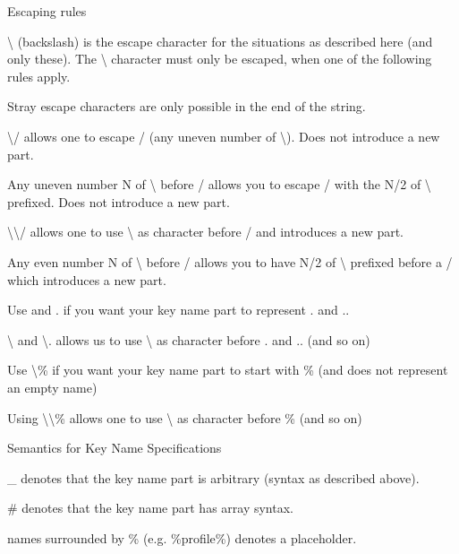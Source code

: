 \begin{DoxyItemize}
\begin{DoxyParagraph}{Escaping rules}
\begin{DoxyItemize}
\item \textbackslash{} (backslash) is the escape character for the situations as described here (and only these). The \textbackslash{} character must only be escaped, when one of the following rules apply.
\item Stray escape characters are only possible in the end of the string.
\item \textbackslash{}/ allows one to escape / (any uneven number of \textbackslash{}). Does not introduce a new part.
\item Any uneven number N of \textbackslash{} before / allows you to escape / with the N/2 of \textbackslash{} prefixed. Does not introduce a new part.
\item \textbackslash{}\textbackslash{}/ allows one to use \textbackslash{} as character before / and introduces a new part.
\item Any even number N of \textbackslash{} before / allows you to have N/2 of \textbackslash{} prefixed before a / which introduces a new part.
\item Use  and . if you want your key name part to represent . and ..
\item \textbackslash{} and \textbackslash{}. allows us to use \textbackslash{} as character before . and .. (and so on)
\item Use \textbackslash{}\% if you want your key name part to start with \% (and does not represent an empty name)
\item Using \textbackslash{}\textbackslash{}\% allows one to use \textbackslash{} as character before \% (and so on)
\end{DoxyItemize}
\end{DoxyParagraph}
\begin{DoxyParagraph}{Semantics for Key Name Specifications}

\begin{DoxyItemize}
\item \+\_\+ denotes that the key name part is arbitrary (syntax as described above).
\item \# denotes that the key name part has array syntax.
\item names surrounded by \% (e.\+g. \%profile\%) denotes a placeholder. 
\end{DoxyItemize}
\end{DoxyParagraph}

\end{DoxyItemize}

